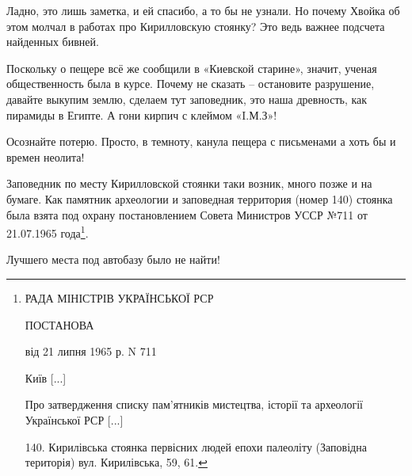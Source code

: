 Ладно, это лишь заметка, и ей спасибо, а то бы не узнали. Но почему Хвойка об этом молчал в работах про Кирилловскую стоянку? Это ведь важнее подсчета найденных бивней.

Поскольку о пещере всё же сообщили в «Киевской старине», значит, ученая общественность была в курсе. Почему не сказать – остановите разрушение, давайте выкупим землю, сделаем тут заповедник, это наша древность, как пирамиды в Египте. А гони кирпич с клеймом «I.М.З»! 

Осознайте потерю. Просто, в темноту, канула пещера с письменами а хоть бы и времен неолита!


Заповедник по месту Кирилловской стоянки таки возник, много позже и на бумаге. Как памятник археологии и заповедная территория (номер 140) стоянка была взята под охрану постановлением Совета Министров УССР №711 от 21.07.1965 года\footnote{
РАДА МІНІСТРІВ УКРАЇНСЬКОЇ РСР

ПОСТАНОВА

від 21 липня 1965 р. N 711

Київ [...]

Про затвердження списку пам'ятників мистецтва, історії та археології Української РСР [...]

140. Кирилівська стоянка первісних людей епохи палеоліту (Заповідна територія) вул. Кирилівська, 59, 61.}.

Лучшего места под автобазу было не найти!



